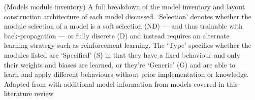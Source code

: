 \begin{table}[]
\begin{tabularx}{\linewidth}{cXcXc}
\end{tabularx}
\captionsource(Models module inventory)
    {A full breakdown of the model inventory and layout construction architecture of each model discussed. `Selection' denotes whether the module selection of a model is a soft selection (ND) --- and thus trainable with back-propagation --- or fully discrete (D) and instead requires an alternate learning strategy such as reinforcement learning. The `Type' specifies whether the modules listed are `Specified' (S) in that they have a fixed behaviour and only their weights and biases are learned, or they're `Generic' (G) and are able to learn and apply different behaviours without prior implementation or knowledge.\label{tab:models_module_inventory}}
    {Adapted from \citeauthor{fishandi_neural_2023}\cite{fishandi_neural_2023} with additional model information from models covered in this literature review}
\end{table}


